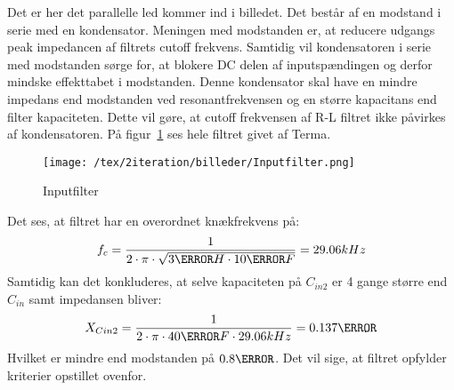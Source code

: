\noindent Det er her det parallelle led kommer ind i billedet. Det består af en modstand i serie med en kondensator. Meningen med modstanden er, at reducere udgangs peak impedancen af filtrets cutoff frekvens. Samtidig vil kondensatoren i serie med modstanden sørge for, at blokere DC delen af inputspændingen og derfor mindske effekttabet i modstanden. Denne kondensator skal have en mindre impedans end modstanden ved resonantfrekvensen og en større kapacitans end filter kapaciteten. Dette vil gøre, at cutoff frekvensen af R-L filtret ikke påvirkes af kondensatoren. På figur~\ref{fig: Inputfilter} ses hele filtret givet af Terma.    
\begin{figure}[H]
	\center
	\texttt{[image: /tex/2iteration/billeder/Inputfilter.png]}
	\caption{Inputfilter}
	\label{fig: Inputfilter}
\end{figure}
Det ses, at filtret har en overordnet knækfrekvens på:
\begin{equation} \label{fc}
f_c = \frac{1}{2 \cdot \pi \cdot \sqrt{3\micro H \cdot 10\micro F}} = 29.06kHz
\end{equation}
Samtidig kan det konkluderes, at selve kapaciteten på $C_{in2}$ er 4 gange større end $C_{in}$ samt impedansen bliver:
\begin{equation} \label{XC2}
X_{Cin2} = \frac{1}{2 \cdot \pi \cdot 40\micro F \cdot 29.06kHz} = 0.137\ohm
\end{equation}
Hvilket er mindre end modstanden på $0.8\ohm$. Det vil sige, at filtret opfylder kriterier opstillet ovenfor.